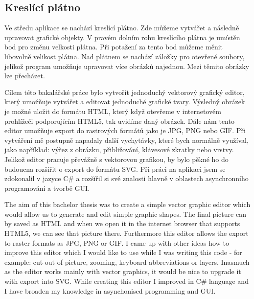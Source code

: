 \documentclass[
  field=inf,
  biblatex,
  glossaries,
  index
]{kidiplom}
\begin{document}
\subsection{Kreslící plátno}

Ve středu aplikace se nachází kreslící plátno. Zde můžeme vytvářet a následně upravovat grafické objekty. V pravém dolním rohu kreslícího plátna je umístěn bod pro změnu velkosti plátna. Při potažení za tento bod můžeme měnit libovolně velikost plátna. Nad plátnem se nachází záložky pro otevřené soubory, jelikož program umožňuje upravovat více obrázků najednou. Mezi těmito obrázky lze přecházet.




\begin{kiconclusions}
Cílem této bakalářské práce bylo vytvořit jednoduchý vektorový grafický editor, který umožňuje vytvářet a editovat jednoduché grafické tvary. Výsledný obrázek je možné uložit do formátu HTML, který když otevřeme v internetovém prohlížeči podporujícím HTML5, tak uvidíme daný obrázek. Dále nám tento editor umožňuje export do rastrových formátů jako je JPG, PNG nebo GIF. Při vytváření mě postupně napadaly další vychytávky, které bych normálně využíval, jako například: výřez z obrázku, přibližování, klávesové zkratky nebo vrstvy. Jelikož editor pracuje převážně s vektorovou grafikou, by bylo pěkné ho do budoucna rozšířit o export do formátu SVG. Při práci na aplikaci jsem se zdokonalil v jazyce C\# a rozšířil si své znalosti hlavně v oblastech asynchronního programování a tvorbě GUI.
\end{kiconclusions}

\begin{kiconclusions}[english]
The aim of this bachelor thesis was to create a simple vector graphic editor which would allow us to generate and edit simple graphic shapes. The final picture can by saved as HTML and when we open it in the internet browser that supports HTML5, we can see that picture there. Furthermore this editor allows the export to raster formats as JPG, PNG or GIF. I came up with other ideas how to improve this editor which I would like to use while I was writing this code - for example: cut-out of picture, zooming, keyboard abbreviations or layers. Inasmuch as the editor works mainly with vector graphics, it would be nice to upgrade it with export into SVG. While creating this editor I improved in C\# language and I have broaden my knowledge in asynchonised programming and GUI.
\end{kiconclusions}
\end{document}
